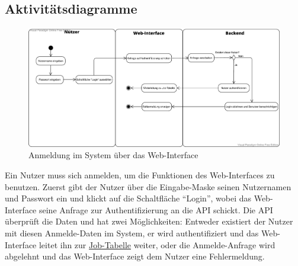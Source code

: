 \pagebreak

\subsection{Aktivitätsdiagramme}
\begin{figure}[H]
    \centering
    \includegraphics[width=\textwidth]{images-interface/v3_aktivitaetsdiagramme/Anmelden_v10.pdf}
    \caption{Anmeldung im System über das \gls{Web-Interface}}
    \label{fig:login_activity}
    
\end{figure}
Ein \gls{Nutzer} muss sich anmelden, um die Funktionen des \gls{Web-Interface}s zu benutzen. Zuerst gibt der \gls{Nutzer} über die Eingabe-Maske seinen Nutzernamen und Passwort ein und klickt auf die Schaltfläche \enquote{Login}, wobei das \gls{Web-Interface} seine Anfrage zur Authentifizierung an die \gls{API} schickt. Die \gls{API} überprüft die Daten und hat zwei Möglichkeiten: Entweder existiert der \gls{Nutzer} mit diesen Anmelde-Daten im System, er wird authentifiziert und das \gls{Web-Interface} leitet ihn zur \hyperref[pages:job-table]{Job-Tabelle} weiter, oder die Anmelde-Anfrage wird abgelehnt und das \gls{Web-Interface} zeigt dem \gls{Nutzer} eine Fehlermeldung.


